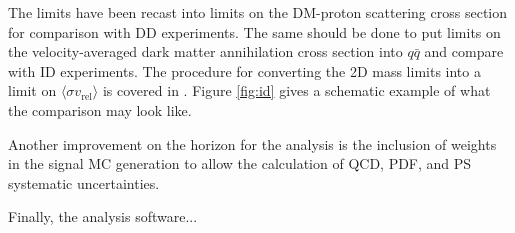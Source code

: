 The \monoZ limits have been recast into limits on the DM-proton scattering cross section for comparison with DD experiments. The same should be done to put limits on the velocity-averaged dark matter annihilation cross section into $q\bar{q}$ and compare with ID experiments. The procedure for converting the 2D mass limits into a limit on $\langle \sigma v_\text{rel} \rangle$ is covered in \cite{Boveia:2016mrp}. Figure \ref{fig:id} gives a schematic example of what the comparison may look like.

Another improvement on the horizon for the analysis is the inclusion of weights in the signal MC generation to allow the calculation of QCD, PDF, and PS systematic uncertainties.

Finally, the analysis software...


